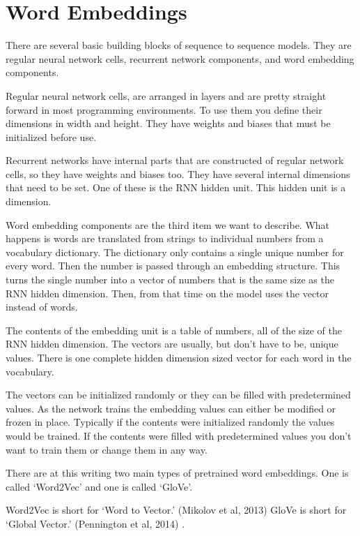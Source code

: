\section{Word Embeddings}

There are several basic building blocks of sequence to sequence models. 
They are regular neural network cells, recurrent
network components, and word embedding components.

Regular neural network cells, are arranged in layers and are pretty
straight forward in most programming environments. To use them you
define their dimensions in width and height. They have weights and
biases that must be initialized before use.

Recurrent networks have internal parts that are constructed of regular
network cells, so they have weights and biases too. They have several
internal dimensions that need to be set. One of these is the RNN hidden
unit. This hidden unit is a dimension.

Word embedding components are the third item we want to describe.
What happens is words are translated from strings to individual numbers
from a vocabulary dictionary. The dictionary only contains a single
unique number for every word. Then the number is passed through an
embedding structure. This turns the single number into a vector of
numbers that is the same size as the RNN hidden dimension. Then, from
that time on the model uses the vector instead of words.

The contents of the embedding unit is a table of numbers, all of the
size of the RNN hidden dimension. The vectors are usually, but don\textquoteright t
have to be, unique values. There is one complete hidden dimension
sized vector for each word in the vocabulary. 

The vectors can be initialized randomly or they can be filled with
predetermined values. As the network trains the embedding values can
either be modified or frozen in place. Typically if the contents were
initialized randomly the values would be trained. If the contents
were filled with predetermined values you don\textquoteright t want
to train them or change them in any way. 

There are at this writing two main types of pretrained word embeddings.
One is called \textquoteleft Word2Vec\textquoteright{} and one is
called \textquoteleft GloVe\textquoteright . 

Word2Vec is short for \textquoteleft Word to Vector.\textquoteright{}
(Mikolov et al, 2013)\cite{mikolov2013efficient} GloVe is short for \textquoteleft Global
Vector.\textquoteright{} (Pennington et al, 2014)\cite{pennington-etal-2014-glove} .


